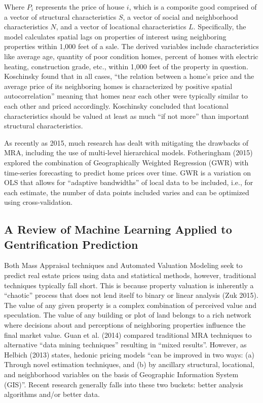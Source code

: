 \documentclass[12pt,]{article}
\begin{document}
Where \(P_i\) represents the price of house \(i\), which is a composite
good comprised of a vector of structural characteristics \(S\), a vector
of social and neighborhood characteristics \(N\), and a vector of
locational characteristics \(L\). Specifically, the model calculates
spatial lags on properties of interest using neighboring properties
within 1,000 feet of a sale. The derived variables include
characteristics like average age, quantity of poor condition homes,
percent of homes with electric heating, construction grade, etc., within
1,000 feet of the property in question. Koschinsky found that in all
cases, ``the relation between a home's price and the average price of
its neighboring homes is characterized by positive spatial
autocorrelation'' meaning that homes near each other were typically
similar to each other and priced accordingly. Koschinsky concluded that
locational characteristics should be valued at least as much ``if not
more'' than important structural characteristics.

As recently as 2015, much research has dealt with mitigating the
drawbacks of MRA, including the use of multi-level hierarchical models.
Fotheringham (2015) explored the combination of Geographically Weighted
Regression (GWR) with time-series forecasting to predict home prices
over time. GWR is a variation on OLS that allows for ``adaptive
bandwidths'' of local data to be included, i.e., for each estimate, the
number of data points included varies and can be optimized using
cross-validation.

\hypertarget{a-review-of-machine-learning-applied-to-gentrification-prediction}{%
\subsection{A Review of Machine Learning Applied to Gentrification
Prediction}\label{a-review-of-machine-learning-applied-to-gentrification-prediction}}

Both Mass Appraisal techniques and Automated Valuation Modeling seek to
predict real estate prices using data and statistical methods, however,
traditional techniques typically fall short. This is because property
valuation is inherently a ``chaotic'' process that does not lend itself
to binary or linear analysis (Zuk 2015). The value of any given property
is a complex combination of perceived value and speculation. The value
of any building or plot of land belongs to a rich network where
decisions about and perceptions of neighboring properties influence the
final market value. Guan et al. (2014) compared traditional MRA
techniques to alternative ``data mining techniques'' resulting in
``mixed results''. However, as Helbich (2013) states, hedonic pricing
models ``can be improved in two ways: (a) Through novel estimation
techniques, and (b) by ancillary structural, locational, and
neighborhood variables on the basis of Geographic Information System
(GIS)''. Recent research generally falls into these two buckets: better
analysis algorithms and/or better data.
\end{document}
